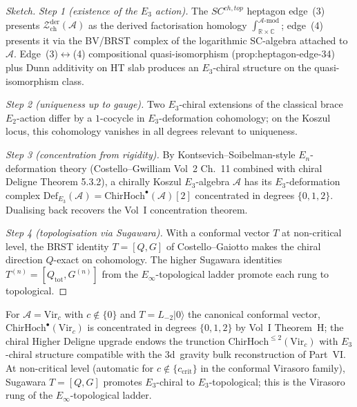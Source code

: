 \documentclass[11pt]{article}
\newcommand{\C}{\mathbb{C}}
\newcommand{\R}{\mathbb{R}}
\begin{document}
\begin{proof}[Sketch]
\textit{Step 1 (existence of the $E_3$ action).} The $SC^{ch,top}$
heptagon edge~(3) presents $\mathcal{Z}^{\mathrm{der}}_{\mathrm{ch}}(\mathcal{A})$
as the derived factorisation homology
$\int_{\R \times \C}^{\mathcal{A}\text{-mod}}$; edge~(4) presents
it via the BV/BRST complex of the logarithmic SC-algebra attached
to $\mathcal{A}$. Edge~(3)$\leftrightarrow$(4) compositional
quasi-isomorphism (prop:heptagon-edge-34) plus Dunn additivity
on HT slab produces an $E_3$-chiral structure on the
quasi-isomorphism class.

\textit{Step 2 (uniqueness up to gauge).} Two $E_3$-chiral
extensions of the classical brace $E_2$-action differ by a
$1$-cocycle in $E_3$-deformation cohomology; on the Koszul
locus, this cohomology vanishes in all degrees relevant to
uniqueness.

\textit{Step 3 (concentration from rigidity).} By
Kontsevich--Soibelman-style $E_n$-deformation theory (Costello--Gwilliam
\cite{CG17} Vol~2 Ch.~11 combined with chiral Deligne Theorem
5.3.2), a chirally Koszul $E_3$-algebra $\mathcal{A}$ has its
$E_3$-deformation complex
$\mathrm{Def}_{E_3}(\mathcal{A}) =
 \mathrm{ChirHoch}^\bullet(\mathcal{A})[2]$ concentrated in degrees
$\{0, 1, 2\}$. Dualising back recovers the Vol~I concentration
theorem.

\textit{Step 4 (topologisation via Sugawara).} With a conformal
vector $T$ at non-critical level, the BRST identity
$T = [Q, G]$ of Costello--Gaiotto
makes the chiral direction $Q$-exact on cohomology. The higher
Sugawara identities $T^{(n)} = [Q_{\mathrm{tot}}, G^{(n)}]$ from
the $E_\infty$-topological ladder promote each rung to topological.
\end{proof}

\begin{example}
\label{ex:theoremH-virasoro-E3top}
For $\mathcal{A} = \mathrm{Vir}_c$ with $c \notin \{0\}$ and
$T = L_{-2}|0\rangle$ the canonical conformal vector,
$\mathrm{ChirHoch}^\bullet(\mathrm{Vir}_c)$ is concentrated in
degrees $\{0, 1, 2\}$ by Vol~I Theorem~H; the chiral Higher
Deligne upgrade endows the trunction
$\mathrm{ChirHoch}^{\le 2}(\mathrm{Vir}_c)$ with $E_3$-chiral
structure compatible with the $3$d~gravity bulk reconstruction
of Part~VI. At non-critical level (automatic for
$c \notin \{c_{\mathrm{crit}}\}$ in the conformal Virasoro
family), Sugawara $T = [Q, G]$ promotes $E_3$-chiral to
$E_3$-topological; this is the Virasoro rung of the
$E_\infty$-topological ladder.
\end{example}
\end{document}
